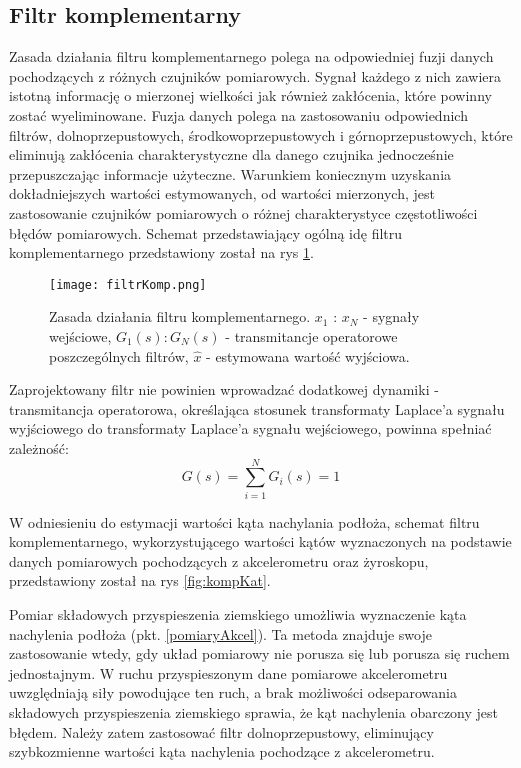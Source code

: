 \subsection{Filtr komplementarny}
\label{kompZasadaDzialania}
Zasada działania filtru komplementarnego polega na odpowiedniej fuzji danych pochodzących z różnych czujników pomiarowych. Sygnał każdego z nich zawiera istotną informację o mierzonej wielkości jak również zakłócenia, które powinny zostać wyeliminowane. Fuzja danych polega na zastosowaniu odpowiednich filtrów, dolnoprzepustowych, środkowoprzepustowych i górnoprzepustowych, które eliminują zakłócenia charakterystyczne dla danego czujnika jednocześnie przepuszczając informacje użyteczne. Warunkiem koniecznym uzyskania dokładniejszych wartości estymowanych, od wartości mierzonych, jest zastosowanie czujników pomiarowych o różnej charakterystyce częstotliwości błędów pomiarowych. Schemat przedstawiający ogólną idę filtru komplementarnego przedstawiony został na rys \ref{fig:kompGeneral}.
\begin{figure}[h]
    \centering
    \texttt{[image: filtrKomp.png]}
    \caption{Zasada działania filtru komplementarnego. $x_1$ : $x_N$ - sygnały wejściowe, $G_1(s) : G_N(s)$ - transmitancje operatorowe poszczególnych filtrów, $\hat{x}$ - estymowana wartość wyjściowa.}
    \label{fig:kompGeneral}
\end{figure}

Zaprojektowany filtr nie powinien wprowadzać dodatkowej dynamiki - transmitancja operatorowa, określająca stosunek transformaty Laplace'a sygnału wyjściowego do transformaty Laplace'a sygnału wejściowego, powinna spełniać zależność:
\begin{equation}
    G(s)=\sum_{i=1}^{N}G_{i}(s)=1
    \label{eq:zasadaKomplementarnosci}
\end{equation}

W odniesieniu do estymacji wartości kąta nachylania podłoża, schemat filtru komplementarnego, wykorzystującego wartości kątów wyznaczonych na podstawie danych pomiarowych pochodzących z akcelerometru oraz żyroskopu, przedstawiony został na rys \ref{fig:kompKat}. 

Pomiar składowych przyspieszenia ziemskiego umożliwia wyznaczenie kąta nachylenia podłoża (pkt. \ref{pomiaryAkcel}). Ta metoda znajduje swoje zastosowanie wtedy, gdy układ pomiarowy nie porusza się lub porusza się ruchem jednostajnym. W ruchu przyspieszonym dane pomiarowe akcelerometru uwzględniają siły powodujące ten ruch, a brak możliwości odseparowania składowych przyspieszenia ziemskiego sprawia, że kąt nachylenia obarczony jest błędem. Należy zatem zastosować filtr dolnoprzepustowy, eliminujący szybkozmienne wartości kąta nachylenia pochodzące z akcelerometru.

